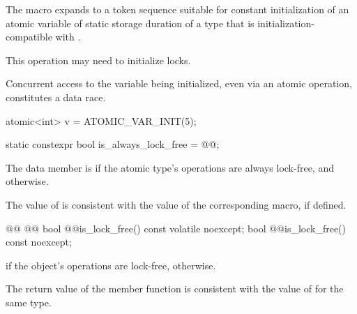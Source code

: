 \begin{itemdescr}
\pnum
The macro expands to a token sequence suitable for
constant initialization of
an atomic variable of static storage duration of a type that is
initialization-compatible with .
\begin{note} This operation may need to initialize locks. \end{note}
Concurrent access to the variable being initialized, even via an atomic operation,
constitutes a data race. \begin{example}
\begin{codeblock}
atomic<int> v = ATOMIC_VAR_INIT(5);
\end{codeblock}
\end{example}
\end{itemdescr}

%
%
%
\begin{itemdecl}
static constexpr bool is_always_lock_free = @@;
\end{itemdecl}

\begin{itemdescr}
\pnum
The  data member  is 
if the atomic type's operations are always lock-free, and  otherwise.
\begin{note}
The value of  is consistent with the value of
the corresponding  macro, if defined.
\end{note}
\end{itemdescr}

%
%
%
%
\begin{itemdecl}
@@
@@
bool @@is_lock_free() const volatile noexcept;
bool @@is_lock_free() const noexcept;
\end{itemdecl}

\begin{itemdescr}
\pnum
\returns {} if the object's operations are lock-free,  otherwise.
\begin{note}
The return value of the  member function
is consistent with the value of  for the same type.
\end{note}
\end{itemdescr}

